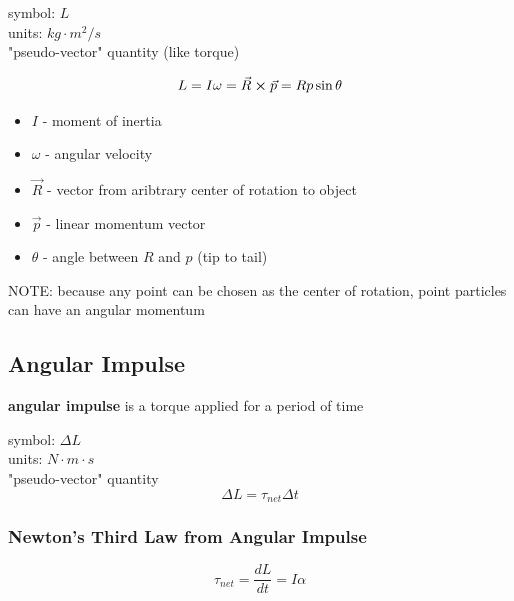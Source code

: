 \documentclass[titlepage]{article}
\begin{document}
symbol: $L$\\
units: $kg \cdot m^2 / s$\\
"pseudo-vector" quantity (like torque)

\begin{equation*}
    L = I \omega = \vec{R} \cross \vec{p} = Rp \sin \theta
\end{equation*}

\begin{itemize}
    \item $I$ - moment of inertia
    \item $\omega$ - angular velocity
    \item $\vec{R}$ - vector from aribtrary center of rotation to object
    \item $\vec{p}$ - linear momentum vector
    \item $\theta$ - angle between $R$ and $p$ (tip to tail)
\end{itemize}

NOTE: because any point can be chosen as the center of rotation, point particles can have an angular momentum

\subsection{Angular Impulse}
\textbf{angular impulse} is a torque applied for a period of time

symbol: $\Delta L$\\
units: $N \cdot m \cdot s$\\
"pseudo-vector" quantity
\begin{equation*}
    \Delta L = \tau_{net} \Delta t
\end{equation*}

\subsubsection{Newton's Third Law from Angular Impulse}
\begin{equation*}
    \tau_{net} = \frac{dL}{dt} = I\alpha
\end{equation*}
\end{document}

